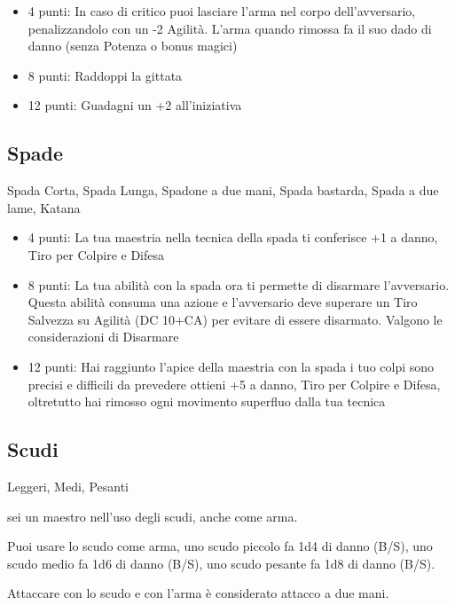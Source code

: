\documentclass[a4paper,11pt,twoside,openany]{book}
\begin{document}
\begin{itemize}

	\item 4 punti: In caso di critico puoi lasciare l'arma nel corpo dell'avversario,
	      penalizzandolo con un -2 Agilità. L'arma quando rimossa fa il suo dado di danno (senza Potenza o bonus magici)

	\item 8 punti: Raddoppi la gittata

	\item 12 punti: Guadagni un +2 all'iniziativa
\end{itemize}

\subsection{Spade} Spada Corta, Spada Lunga, Spadone a due mani, Spada bastarda, Spada a due lame, Katana

\begin{itemize}

	\item 4 punti: La tua maestria nella tecnica della spada ti conferisce +1 a danno, Tiro per Colpire e Difesa

	\item 8 punti: La tua abilità con la spada ora ti permette di disarmare l'avversario. Questa abilità consuma una azione e l'avversario deve superare un Tiro Salvezza su Agilità (DC 10+CA) per evitare di essere disarmato. Valgono le considerazioni di Disarmare

	\item 12 punti: Hai raggiunto l'apice della maestria con la spada i tuo colpi sono precisi e difficili da prevedere ottieni +5 a danno, Tiro per Colpire e Difesa, oltretutto hai rimosso ogni movimento superfluo dalla tua tecnica
\end{itemize}

\subsection{Scudi} Leggeri, Medi, Pesanti

sei un maestro nell'uso degli scudi, anche come arma.

Puoi usare lo scudo come arma, uno scudo piccolo fa 1d4 di danno (B/S), uno scudo medio fa 1d6 di danno (B/S), uno scudo pesante fa 1d8 di danno (B/S).

Attaccare con lo scudo e con l'arma è considerato attacco a due mani.
\end{document}
